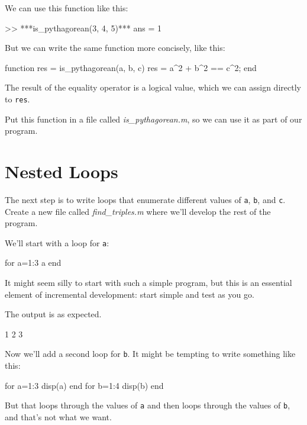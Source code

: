 We can use this function like this:

\newpage

\begin{code}
>> ***is_pythagorean(3, 4, 5)***
ans = 1
\end{code}

But we can write the same function more concisely, like this:

\begin{code}
function res = is_pythagorean(a, b, c)
    res = a^2 + b^2 == c^2;
end
\end{code}

The result of the equality operator is a logical value, which we can assign directly 
to \lstinline{res}.

Put this function in a file called \emph{is\_pythagorean.m}, so we can use it as part of our program.


\section{Nested Loops}

The next step is to write loops that enumerate different values of \lstinline{a}, \lstinline{b}, and 
\lstinline{c}.  Create a new file called \emph{find\_triples.m} where we'll develop the rest of the program.


We'll start with a loop for \lstinline{a}:

\begin{code}
for a=1:3
    a
end
\end{code}

It might seem silly to start with such a simple program, but this is an essential element of incremental development: start simple and test as you go.

The output is as expected.

\begin{code}
1
2
3
\end{code}

Now we'll add a second loop for \lstinline{b}.  It might be tempting to write something like this:

\begin{code}
for a=1:3
    disp(a)
end
for b=1:4
    disp(b)
end
\end{code}

But that loops through the values of \lstinline{a} and then loops through the values of \lstinline{b}, and that's not what we want.

